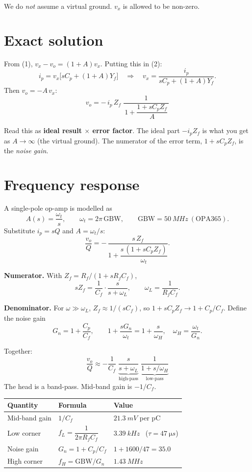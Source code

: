 \documentclass[11pt,a4paper]{article}
\begin{document}
We do \emph{not} assume a virtual ground. $v_x$ is allowed to be non-zero.

\section{Exact solution}

From (1), $v_x-v_o=(1+A)v_x$. Putting this in (2):
\[
i_p=v_x\Big[sC_p+(1+A)Y_f\Big]
\quad\Rightarrow\quad
v_x=\frac{i_p}{sC_p+(1+A)Y_f}.
\]
Then $v_o=-A\,v_x$:
\[
\boxed{\;v_o=-\,i_p\,Z_f\;\frac{1}{\,1+\dfrac{1+sC_pZ_f}{A}\,}\;}
\]

\begin{key}
Read this as \textbf{ideal result $\times$ error factor}. The ideal part $-i_pZ_f$ is what you get as $A\to\infty$ (the virtual ground). The numerator of the error term, $1+sC_pZ_f$, is the \emph{noise gain}.
\end{key}

\section{Frequency response}

A single-pole op-amp is modelled as
\[
A(s)=\frac{\omega_t}{s},\qquad \omega_t=2\pi\,\mathrm{GBW},\qquad \mathrm{GBW}=\SI{50}{MHz}\ (\text{OPA365}).
\]
Substitute $i_p=sQ$ and $A=\omega_t/s$:
\[
\frac{v_o}{Q}=-\,\frac{s\,Z_f}{1+\dfrac{s\,(1+sC_pZ_f)}{\omega_t}} .
\]

\textbf{Numerator.} With $Z_f=R_f/(1+sR_fC_f)$,
\[
sZ_f=\frac1{C_f}\cdot\frac{s}{s+\omega_L},\qquad \omega_L=\frac1{R_fC_f}.
\]

\textbf{Denominator.} For $\omega\gg\omega_L$, $Z_f\approx 1/(sC_f)$, so $1+sC_pZ_f\to 1+C_p/C_f$. Define the noise gain
\[
G_n=1+\frac{C_p}{C_f},\qquad
1+\frac{sG_n}{\omega_t}=1+\frac{s}{\omega_H},\quad \omega_H=\frac{\omega_t}{G_n}.
\]

Together:
\[
\boxed{\;\frac{v_o}{Q}\approx-\frac1{C_f}\;
\underbrace{\frac{s}{s+\omega_L}}_{\text{high-pass}}\;
\underbrace{\frac{1}{1+s/\omega_H}}_{\text{low-pass}}\;}
\]
The head is a band-pass. Mid-band gain is $-1/C_f$.

\begin{center}
\begin{tabular}{lll}
\toprule
Quantity & Formula & Value\\
\midrule
Mid-band gain & $1/C_f$ & $\SI{21.3}{mV}$ per pC\\
Low corner & $f_L=\dfrac1{2\pi R_fC_f}$ & $\SI{3.39}{kHz}$ \ ($\tau=\SI{47}{\micro s}$)\\
Noise gain & $G_n=1+C_p/C_f$ & $1+1600/47=35.0$\\
High corner & $f_H=\mathrm{GBW}/G_n$ & $\SI{1.43}{MHz}$\\
\bottomrule
\end{tabular}
\end{center}
\end{document}

